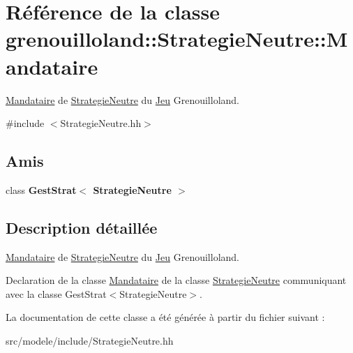 \hypertarget{classgrenouilloland_1_1StrategieNeutre_1_1Mandataire}{\section{Référence de la classe grenouilloland\-:\-:Strategie\-Neutre\-:\-:Mandataire}
\label{classgrenouilloland_1_1StrategieNeutre_1_1Mandataire}
}


\hyperlink{classgrenouilloland_1_1StrategieNeutre_1_1Mandataire}{Mandataire} de \hyperlink{classgrenouilloland_1_1StrategieNeutre}{Strategie\-Neutre} du \hyperlink{classgrenouilloland_1_1Jeu}{Jeu} Grenouilloland.  




{\ttfamily \#include $<$Strategie\-Neutre.\-hh$>$}

\subsection*{Amis}
\begin{DoxyCompactItemize}
\item 
\hypertarget{classgrenouilloland_1_1StrategieNeutre_1_1Mandataire_a41dedab04f65b32ea9d00991cea29cdf}{class {\bfseries Gest\-Strat$<$ Strategie\-Neutre $>$}}\label{classgrenouilloland_1_1StrategieNeutre_1_1Mandataire_a41dedab04f65b32ea9d00991cea29cdf}

\end{DoxyCompactItemize}


\subsection{Description détaillée}
\hyperlink{classgrenouilloland_1_1StrategieNeutre_1_1Mandataire}{Mandataire} de \hyperlink{classgrenouilloland_1_1StrategieNeutre}{Strategie\-Neutre} du \hyperlink{classgrenouilloland_1_1Jeu}{Jeu} Grenouilloland. 

Declaration de la classe \hyperlink{classgrenouilloland_1_1StrategieNeutre_1_1Mandataire}{Mandataire} de la classe \hyperlink{classgrenouilloland_1_1StrategieNeutre}{Strategie\-Neutre} communiquant avec la classe Gest\-Strat$<$\-Strategie\-Neutre$>$. 

La documentation de cette classe a été générée à partir du fichier suivant \-:\begin{DoxyCompactItemize}
\item 
src/modele/include/Strategie\-Neutre.\-hh\end{DoxyCompactItemize}
